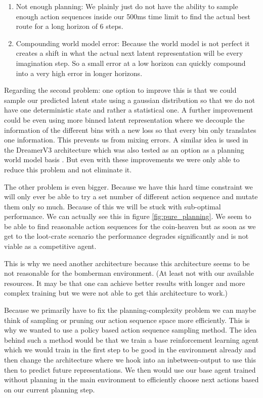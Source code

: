 \documentclass[article, 10pt]{IEEEtran}
\begin{document}
\begin{enumerate}
    \item Not enough planning: We plainly just do not have the ability to sample enough action sequences inside our 500ms time limit to find the actual best route for a long horizon of 6 steps.
    \item Compounding world model error: Because the world model is not perfect it creates a shift in what the actual next latent representation will be every imagination step. So a small error at a low horizon can quickly compound into a very high error in longer horizons.
\end{enumerate}


Regarding the second problem: one option to improve this is that we could sample our predicted latent state using a gaussian distribution so that we do not have one deterministic state and rather a statistical one. A further improvement could be even using more binned latent representation where we decouple the information of the different bins with a new loss so that every bin only translates one information. This prevents us from mixing errors. A similar idea is used in the DreamerV3 architecture which was also tested as an option as a planning world model basis \cite{hafner2023dreamerv3}. But even with these improvements we were only able to reduce this problem and not eliminate it.

The other problem is even bigger. Because we have this hard time constraint we will only ever be able to try a set number of different action sequence and mutate them only so much. Because of this we will be stuck with sub-optimal performance. We can actually see this in figure \ref{fig:pure_planning}. We seem to be able to find reasonable action sequences for the coin-heaven but as soon as we get to the loot-crate scenario the performance degrades significantly and is not viable as a competitive agent.

This is why we need another architecture because this architecture seems to be not reasonable for the bomberman environment. (At least not with our available resources. It may be that one can achieve better results with longer and more complex training but we were not able to get this architecture to work.)

Because we primarily have to fix the planning-complexity problem we can maybe think of sampling or pruning our action sequence space more efficiently. This is why we wanted to use a policy based action sequence sampling method. The idea behind such a method would be that we train a base reinforcement learning agent which we would train in the first step to be good in the environment already and then change the architecture where we hook into an inbetween-output to use this then to predict future representations. We then would use our base agent trained without planning in the main environment to efficiently choose next actions based on our current planning step.
\end{document}
